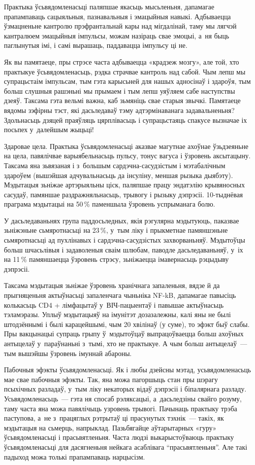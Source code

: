 Практыка ўсьвядомленасьці паляпшае якасьць мысьленьня, дапамагае прапампаваць сацыяльныя, пазнавальныя і эмацыйныя навыкі. Адбываецца ўзмацненьне кантролю прэфрантальнай кары над мігдалінай, таму мы лягчэй кантралюем эмацыйныя імпульсы, можам назіраць свае эмоцыі, а~ня быць паглынутыя імі, і самі вырашаць, паддавацца імпульсу ці не.

Як вы памятаеце, пры стрэсе часта адбываецца «крадзеж мозгу», але той, хто практыкуе ўсьвядомленасьць, рэдка страчвае кантроль над сабой. Чым лепш мы супрацьстаім імпульсам, тым гэта карысьней для нашых адносінаў і здароўя, тым больш слушныя рашэньні мы прымаем і тым лепш уяўляем сабе наступствы дзеяў. Таксама гэта вельмі важна, каб зьмяніць свае старыя звычкі. Памятаеце вядомы зэфірны тэст, які дасьледаваў тэму адтэрмінаванага задавальненьня? Здольнасьць дзяцей праяўляць цярплівасьць і супрацьстаяць спакусе вызначае іх посьпех у~далейшым жыцьці!

Здаровае цела. Практыка ўсьвядомленасьці аказвае магутнае ахоўнае ўзьдзеяньне на цела, павялічвае варыябельнасьць пульсу, тонус вагуса і ўзровень аксытацыну. Таксама яна зьвязаная і з~большым сардэчна-сасудзістым і мэтабалічным здароўем (вышэйшая адчувальнасьць да інсуліну, меншая рызыка дыябэту). Мэдытацыя зьніжае артэрыяльны ціск, паляпшае працу эндатэлію крывяносных сасудаў, памяншае раздражняльнасьць, трывогу і рызыку дэпрэсіі. 10-тыднёвая праграма мэдытацыі на 50\,\% паменшыла ўзровень успрыманага болю.

У дасьледаваньнях група паддосьледных, якія рэгулярна мэдытуюць, паказвае зьніжэньне сьмяротнасьці на 23\,\%, у~тым ліку і прыкметнае памяншэньне сьмяротнасьці ад пухлінавых і сардэчна-сасудзістых захворваньняў. Мэдытоўцы больш шчасьлівыя і задаволеныя сваім шлюбам, паводле дасьледаваньняў, у~іх на 11\,\% памяншаецца ўзровень стрэсу, зьніжаецца імавернасьць рэцыдыву дэпрэсіі.

Таксама мэдытацыя зьніжае ўзровень хранічнага запаленьня, вядзе й да прыгняценьня актыўнасьці запаленчага чыньніка NF-kB, дапамагае павысіць колькасьць CD4 + лімфацытаў у~ВІЧ-пацыентаў і павышае актыўнасьць тэламэразы. Уплыў мэдытацыяў на імунітэт дозазалежны, калі яны не былі штодзённымі і былі карацейшымі, чым 20 хвілінаў (у суме), то эфэкт быў слабы. Пры вакцынацыі супраць грыпу ў~мэдытоўцаў выпрацоўваецца больш ахоўных антыцелаў у~параўнаньні з~тымі, хто не практыкуе. А чым больш антыцелаў~--- тым вышэйшы ўзровень імуннай абароны.

Пабочныя эфэкты ўсьвядомленасьці. Як і любы дзейсны мэтад, усьвядомленасьць мае свае пабочныя эфэкты. Так, яна можа пагоршыць стан пры шэрагу псыхічных разладаў, у~тым ліку некаторых відаў дэпрэсіі і біпалярнага разладу. Усьвядомленасьць~--- гэта ня спосаб рэляксацыі, а~дасьледзіны свайго розуму, таму часта яна можа павялічыць узровень трывогі. Пачынаць практыку трэба паступова, а~не з~працяглых рэтрытаў ці прасунутых тэхнік~--- такіх, як мэдытацыя на сьмерць, напрыклад. Пазьбягайце аўтарытарных «гуру» ўсьвядомленасьці і прасьвятленьня. Часта людзі выкарыстоўваюць практыку ўсьвядомленасьці для дасягненьня нейкага асаблівага ``прасьвятленьня''. Але такі падыход можа толькі прапампаваць нарцысізм.

